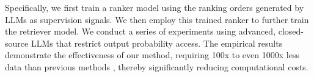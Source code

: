 Specifically, we first train a ranker model using the ranking orders generated by LLMs as supervision signals. We then employ this trained ranker to further train the retriever model.
We conduct a series of experiments using advanced, closed-source LLMs that restrict output probability access.
The empirical results demonstrate the effectiveness of our method, requiring 100x to even 1000x less data than previous methods \cite{ram2023context, shi2023replug}, thereby significantly reducing computational costs.
